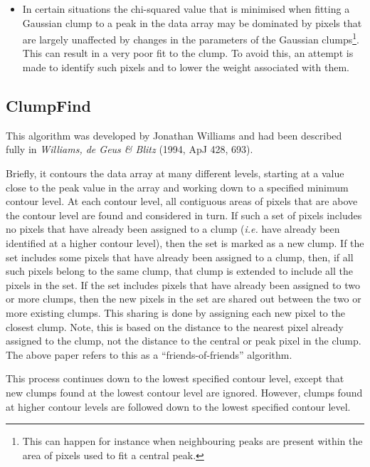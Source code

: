 \documentclass[twoside,11pt]{starlink}
\begin{document}
\begin{itemize}
\item In certain situations the chi-squared value that is minimised when
fitting a Gaussian clump to a peak in the data array may be dominated by
pixels that are largely unaffected by changes in the parameters of the
Gaussian clumps\footnote{This can happen for instance when neighbouring
peaks are present within the area of pixels used to fit a central peak.}.
This can result in a very poor fit to the clump. To avoid this, an attempt
is made to identify such pixels and to lower the weight associated with
them.

\end{itemize}



\subsection{ClumpFind}
This algorithm was developed by Jonathan Williams and had been described
fully in \emph{Williams, de Geus \& Blitz} (1994, ApJ 428, 693).

Briefly, it contours the data array at many different levels, starting at
a value close to the peak value in the array and working down to a
specified minimum contour level. At each contour level, all contiguous
areas of pixels that are above the contour level are found and considered
in turn. If such a set of pixels includes no pixels that have already
been assigned to a clump (\emph{i.e.} have already been identified at a
higher contour level), then the set is marked as a new clump. If the set
includes some pixels that have already been assigned to a clump, then, if
all such pixels belong to the same clump, that clump is extended to
include all the pixels in the set. If the set includes pixels that have
already been assigned to two or more clumps, then the new pixels in the
set are shared out between the two or more existing clumps. This sharing
is done by assigning each new pixel to the closest clump. Note, this is
based on the distance to the nearest pixel already assigned to the clump,
not the distance to the central or peak pixel in the clump. The above
paper refers to this as a ``friends-of-friends'' algorithm.

This process continues down to the lowest specified contour level, except
that new clumps found at the lowest contour level are ignored. However,
clumps found at higher contour levels are followed down to the lowest
specified contour level.
\end{document}
